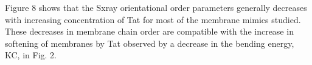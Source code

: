 \documentclass[12pt,letterpaper]{article}
\begin{document}
Figure 8 shows that the Sxray orientational order parameters generally 
decreases with increasing concentration of Tat for most of the membrane mimics 
studied.  These decreases in membrane chain order are compatible with the 
increase in softening of membranes by Tat observed by a decrease in the bending
energy, KC, in Fig. 2.




\end{document}
